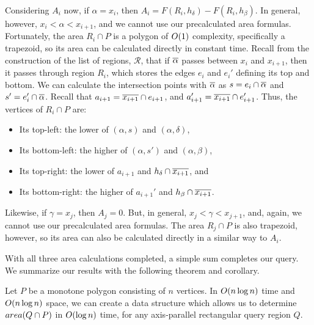 Considering $A_i$ now, if $\alpha = x_i$, then $A_i = F(R_i, h_\delta) - F(R_i, h_\beta)$. 
In general, however, $x_i < \alpha < x_{i+1}$, and we cannot use our precalculated area formulas.
Fortunately, the area $R_i \cap P$ is a polygon of $O\!\left(1\right)$ complexity, specifically a trapezoid, so its area can be calculated directly in constant time. 
Recall from the construction of the list of regions, $\mathcal{R}$, that if $\overline{\alpha}$ passes between $x_i$ and $x_{i+1}$, then it passes through region $R_i$, which stores the edges $e_i$ and $e_i'$ defining its top and bottom. 
We can calculate the intersection points with $\overline{\alpha}$ as $s = e_i \cap \overline{\alpha}$ and $s' = e_i' \cap \overline{\alpha}$.
Recall that $a_{i+1} = \overline{x_{i+1}} \cap e_{i+1}$, and $a_{i+1}' = \overline{x_{i+1}} \cap e_{i+1}'$.
Thus, the vertices of $R_i \cap P$ are:
\begin{itemize}
 \item Its top-left: the lower of $(\alpha, s)$ and $(\alpha, \delta)$,

 \item Its bottom-left: the higher of $(\alpha, s')$ and $(\alpha, \beta)$,

 \item Its top-right: the lower of $a_{i+1}$ and $h_\delta \cap \overline{x_{i+1}}$, and

 \item Its bottom-right: the higher of $a_{i+1}'$ and $h_\beta \cap \overline{x_{i+1}}$.

\end{itemize}

Likewise, if $\gamma = x_j$, then $A_j = 0$. But, in general, $x_j < \gamma < x_{j+1}$, and, again, we cannot use our precalculated area formulas.
The area $R_j \cap P$ is also trapezoid, however, so its area can also be calculated directly in a similar way to $A_i$.

With all three area calculations completed, a simple sum completes our query. We summarize our results with the following theorem and corollary.

\begin{theorem}
\label{th:monotonep:rect:area}
Let $P$ be a monotone polygon consisting of $n$ vertices. 
In $O\!\left(n \log{n}\right)$ time and $O\!\left(n \log{n}\right)$ space, we can create a data structure which allows us to determine $area(Q \cap P)$ in $O\!\left(\log{n}\right)$ time, for any axis-parallel rectangular query region $Q$.
\end{theorem}

